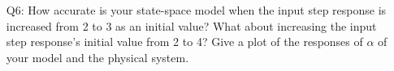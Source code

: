 \documentclass[12pt]{report}
\newcommand\drew[1]{\textcolor{red}{#1}}
\begin{document}
\begin{enumerate}[Question]
    \item[Q6:] How accurate is your state-space model when the input step response is increased from 2 to 3 as an initial value? What about increasing the input step response's initial value from 2 to 4? Give a plot of the responses of $\alpha$ of your model and the physical system.\\
\end{enumerate}
\newpage
\end{document}
